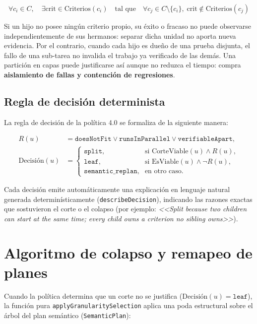 \begin{equation}
\forall c_i \in C, \quad \exists \text{crit} \in \text{Criterios}(c_i) \quad \text{tal que} \quad \forall c_j \in C \setminus \{c_i\}, \; \text{crit} \notin \text{Criterios}(c_j)
\label{eq:verifiable-apart}
\end{equation}

\noindent Si un hijo no posee ningún criterio propio, su éxito o fracaso no puede observarse independientemente de sus hermanos: separar dicha unidad no aporta nueva evidencia. Por el contrario, cuando cada hijo es dueño de una prueba disjunta, el fallo de una sub-tarea no invalida el trabajo ya verificado de las demás. Una partición en capas puede justificarse así aunque no reduzca el tiempo: compra \textbf{aislamiento de fallas y contención de regresiones}.

\subsection{Regla de decisión determinista}

La regla de decisión de la política 4.0 se formaliza de la siguiente manera:

\begin{align}
R(u) &= \texttt{doesNotFit} \lor \texttt{runsInParallel}
        \lor \texttt{verifiableApart}, \nonumber\\
\text{Decisión}(u) &=
\begin{cases}
\texttt{split}, & \text{si } \text{CorteViable}(u) \land R(u), \\
\texttt{leaf}, & \text{si } \text{EsViable}(u) \land \neg R(u), \\
\texttt{semantic\_replan}, & \text{en otro caso.}
\end{cases}
\label{eq:decision-rule}
\end{align}

Cada decisión emite automáticamente una explicación en lenguaje natural generada determinísticamente (\texttt{describeDecision}), indicando las razones exactas que sostuvieron el corte o el colapso (por ejemplo: \emph{<<Split because two children can start at the same time; every child owns a criterion no sibling owns>>}).

\section{Algoritmo de colapso y remapeo de planes}
\label{sec:colapso-plan}

Cuando la política determina que un corte no se justifica ($\text{Decisión}(u) = \texttt{leaf}$), la función pura \texttt{applyGranularitySelection} aplica una poda estructural sobre el árbol del plan semántico (\texttt{SemanticPlan}):

